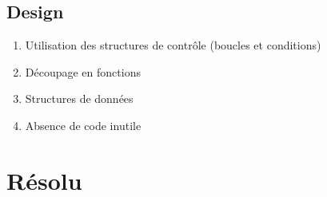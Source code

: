 \documentclass[11pt,french,a4paper,twoside]{scrartcl}
\begin{document}
\subsection{Design}
\begin{enumerate}
	\item Utilisation des structures de contrôle (boucles et conditions)
	\item Découpage en fonctions
	\item Structures de données
	\item Absence de code inutile
\end{enumerate}


\section{Résolu}

\begin{singlespace}
	\inputminted{C}{sources/polygons.c}
\end{singlespace}
\end{document}
